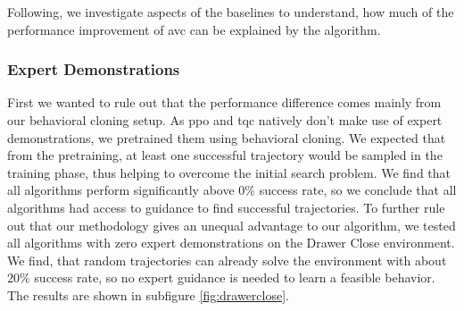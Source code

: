 Following, we investigate aspects of the baselines to understand, how much of the performance improvement of \ac{avc} can be explained by the algorithm. 

\subsubsection{Expert Demonstrations}
First we wanted to rule out that the performance difference comes mainly from our behavioral cloning setup. As \ac{ppo} and \ac{tqc} natively don't make use of expert demonstrations,
we pretrained them using behavioral cloning. We expected that from the pretraining, at least one successful trajectory would be sampled in the training phase, thus
helping to overcome the initial search problem. We find that all algorithms perform significantly above $0\%$ success rate, so we conclude that all algorithms had
access to guidance to find successful trajectories. To further rule out that our methodology gives an unequal advantage to our algorithm, we tested all algorithms with 
zero expert demonstrations on the 
Drawer Close environment. We find, that random trajectories can already solve the environment with about $20\%$ success rate, so no expert guidance is needed to learn a feasible behavior.
The results are shown in subfigure \ref{fig:drawerclose}.\\ 

